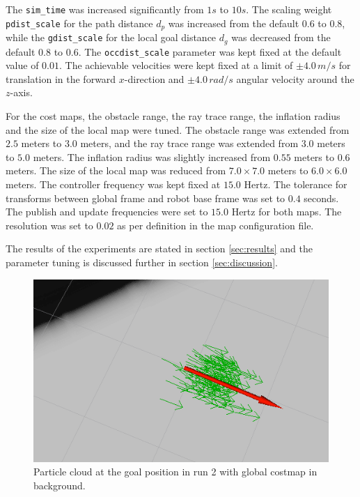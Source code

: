 \documentclass[10pt,journal,compsoc]{IEEEtran}
\begin{document}
The \texttt{sim\_time} was increased significantly from $1 s$ to $10 s$. The scaling weight \texttt{pdist\_scale} for the path distance $d_p$ was increased from the default $0.6$ to $0.8$, while the \texttt{gdist\_scale} for the local goal distance $d_g$ was decreased from the default $0.8$ to $0.6$. The \texttt{occdist\_scale} parameter was kept fixed at the default value of $0.01$. The achievable velocities were kept fixed at a limit of $\pm 4.0 \, m/s$ for translation in the forward $x$-direction and $\pm 4.0 \, rad/s$ angular velocity around the $z$-axis.

For the cost maps, the obstacle range, the ray trace range, the inflation radius and the size of the local map were tuned. The obstacle range was extended from $2.5$ meters to $3.0$ meters, and the ray trace range was extended from $3.0$ meters to $5.0$ meters. The inflation radius was slightly increased from $0.55$ meters to $0.6$ meters. The size of the local map was reduced from $7.0 \times 7.0$ meters to $6.0 \times 6.0$ meters. The controller frequency was kept fixed at $15.0$ Hertz. The tolerance for transforms between global frame and robot base frame was set to $0.4$ seconds. The publish and update frequencies were set to $15.0$ Hertz for both maps. The resolution was set to $0.02$ as per definition in the map configuration file.

The results of the experiments are stated in section \ref{sec:results} and the parameter tuning is discussed further in section \ref{sec:discussion}.

\begin{figure}[thpb]
      \centering
      \includegraphics[width=\linewidth]{images/run_2_goal.PNG}
      \caption{Particle cloud at the goal position in run 2 with global costmap in background.}
      \label{fig:result_experiment_2}
\end{figure}
\end{document}
